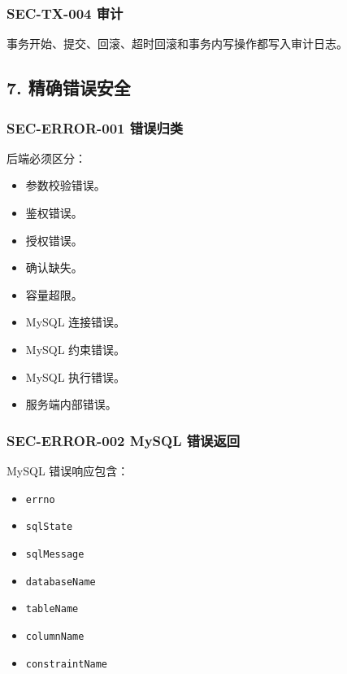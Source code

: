 \documentclass[
  a4paper,
  UTF8]{ctexart}
\providecommand{\tightlist}{%
  \setlength{\itemsep}{0pt}\setlength{\parskip}{0pt}}
\begin{document}
\hypertarget{sec-tx-004-ux5ba1ux8ba1}{%
\subsubsection{SEC-TX-004 审计}\label{sec-tx-004-ux5ba1ux8ba1}}

事务开始、提交、回滚、超时回滚和事务内写操作都写入审计日志。

\hypertarget{ux7cbeux786eux9519ux8befux5b89ux5168}{%
\subsection{7.
精确错误安全}\label{ux7cbeux786eux9519ux8befux5b89ux5168}}

\hypertarget{sec-error-001-ux9519ux8befux5f52ux7c7b}{%
\subsubsection{SEC-ERROR-001
错误归类}\label{sec-error-001-ux9519ux8befux5f52ux7c7b}}

后端必须区分：

\begin{itemize}
\tightlist
\item
  参数校验错误。
\item
  鉴权错误。
\item
  授权错误。
\item
  确认缺失。
\item
  容量超限。
\item
  MySQL 连接错误。
\item
  MySQL 约束错误。
\item
  MySQL 执行错误。
\item
  服务端内部错误。
\end{itemize}

\hypertarget{sec-error-002-mysql-ux9519ux8befux8fd4ux56de}{%
\subsubsection{SEC-ERROR-002 MySQL
错误返回}\label{sec-error-002-mysql-ux9519ux8befux8fd4ux56de}}

MySQL 错误响应包含：

\begin{itemize}
\tightlist
\item
  \texttt{errno}
\item
  \texttt{sqlState}
\item
  \texttt{sqlMessage}
\item
  \texttt{databaseName}
\item
  \texttt{tableName}
\item
  \texttt{columnName}
\item
  \texttt{constraintName}
\end{itemize}
\end{document}
